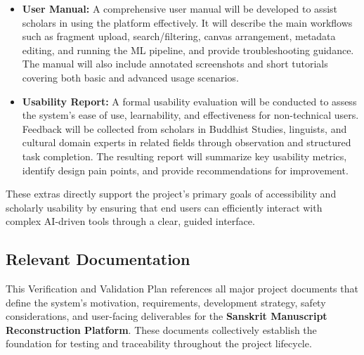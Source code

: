 \documentclass[12pt, titlepage]{article}
\begin{document}
\begin{itemize}
    \item \textbf{User Manual:}  
    A comprehensive user manual will be developed to assist scholars in using the platform effectively. It will describe the main workflows such as fragment upload, search/filtering, canvas arrangement, metadata editing, and running the ML pipeline, and provide troubleshooting guidance. The manual will also include annotated screenshots and short tutorials covering both basic and advanced usage scenarios.

    \item \textbf{Usability Report:}  
    A formal usability evaluation will be conducted to assess the system’s ease of use, learnability, and effectiveness for non-technical users. Feedback will be collected from scholars in Buddhist Studies, linguists, and cultural domain experts in related fields through observation and structured task completion. The resulting report will summarize key usability metrics, identify design pain points, and provide recommendations for improvement.
\end{itemize}

These extras directly support the project’s primary goals of accessibility and scholarly usability by ensuring that end users can efficiently interact with complex AI-driven tools through a clear, guided interface.

\subsection{Relevant Documentation}

This Verification and Validation Plan references all major project documents that define the system’s motivation, requirements, development strategy, safety considerations, and user-facing deliverables for the \textbf{Sanskrit Manuscript Reconstruction Platform}. These documents collectively establish the foundation for testing and traceability throughout the project lifecycle.
\end{document}
